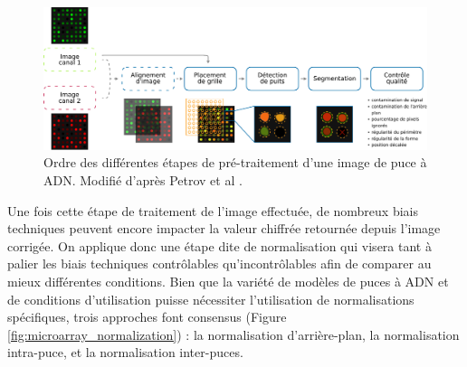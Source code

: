 \begin{figure}[!h]
    \centering
    \includegraphics[width=\textwidth]{img/intro/2_meth_transcripto/intro_2_microarray_image_preprocessing.pdf}
    \caption{Ordre des différentes étapes de pré-traitement d'une image de puce à ADN. Modifié d'après Petrov et al \cite{Petrov2004Nov}.}
    \label{fig:microarray_image_preprocessing}
\end{figure}

Une fois cette étape de traitement de l'image effectuée, de nombreux biais techniques peuvent encore impacter la valeur chiffrée retournée depuis l'image corrigée. On applique donc une étape dite de normalisation qui visera tant à palier les biais techniques contrôlables qu'incontrôlables afin de comparer au mieux différentes conditions. Bien que la variété de modèles de puces à ADN et de conditions d'utilisation puisse nécessiter l'utilisation de normalisations spécifiques, trois approches font consensus \cite{Smyth2003Dec} (Figure \ref{fig:microarray_normalization}) : la normalisation d'arrière-plan, la normalisation intra-puce, et la normalisation inter-puces.



